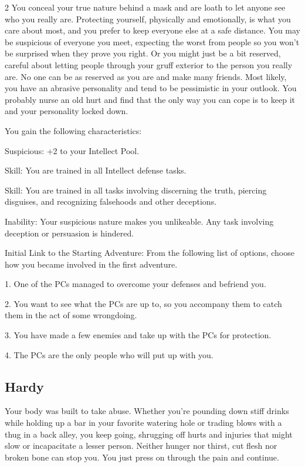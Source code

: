 \begin{multicols}{2}
You conceal your true nature behind a mask and are loath to let anyone see who you really are. Protecting yourself, physically and emotionally, is what you care about most, and you prefer to keep everyone else at a safe distance. You may be suspicious of everyone you meet, expecting the worst from people so you won’t be surprised when they prove you right. Or you might just be a bit reserved, careful about letting people through your gruff exterior to the person you really are.
No one can be as reserved as you are and make many friends. Most likely, you have an abrasive personality and tend to be pessimistic in your outlook. You probably nurse an old hurt and find that the only way you can cope is to keep it and your personality locked down. 

You gain the following characteristics:

Suspicious: +2 to your Intellect Pool.

Skill: You are trained in all Intellect defense tasks.

Skill: You are trained in all tasks involving discerning the truth, piercing disguises, and recognizing falsehoods and other deceptions.

Inability: Your suspicious nature makes you unlikeable. Any task involving deception or persuasion is hindered.

Initial Link to the Starting Adventure: From the following list of options, choose how you became involved in the first adventure.

1. One of the PCs managed to overcome your defenses and befriend you. 

2. You want to see what the PCs are up to, so you accompany them to catch them in the act of some wrongdoing. 

3. You have made a few enemies and take up with the PCs for protection.

4. The PCs are the only people who will put up with you.

\subsection{Hardy}

Your body was built to take abuse. Whether you’re pounding down stiff drinks while holding up a bar in your favorite watering hole or trading blows with a thug in a back alley, you keep going, shrugging off hurts and injuries that might slow or incapacitate a lesser person. Neither hunger nor thirst, cut flesh nor broken bone can stop you. You just press on through the pain and continue.


\end{multicols}

